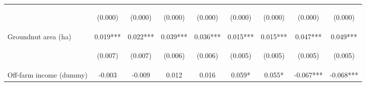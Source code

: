 \begin{center}
\begin{tabular}{lcccccccc}
\vspace{4pt} & \begin{footnotesize}(0.000)\end{footnotesize} & \begin{footnotesize}(0.000)\end{footnotesize} & \begin{footnotesize}(0.000)\end{footnotesize} & \begin{footnotesize}(0.000)\end{footnotesize} & \begin{footnotesize}(0.000)\end{footnotesize} & \begin{footnotesize}(0.000)\end{footnotesize} & \begin{footnotesize}(0.000)\end{footnotesize} & \begin{footnotesize}(0.000)\end{footnotesize} \\
Groundnut area (ha) & 0.019*** & 0.022*** & 0.039*** & 0.036*** & 0.015*** & 0.015*** & 0.047*** & 0.049*** \\
\vspace{4pt} & \begin{footnotesize}(0.007)\end{footnotesize} & \begin{footnotesize}(0.007)\end{footnotesize} & \begin{footnotesize}(0.006)\end{footnotesize} & \begin{footnotesize}(0.006)\end{footnotesize} & \begin{footnotesize}(0.005)\end{footnotesize} & \begin{footnotesize}(0.005)\end{footnotesize} & \begin{footnotesize}(0.005)\end{footnotesize} & \begin{footnotesize}(0.005)\end{footnotesize} \\
Off-farm income (dummy) & -0.003 & -0.009 & 0.012 & 0.016 & 0.059* & 0.055* & -0.067*** & -0.068*** \\

\end{tabular}
\end{center}

